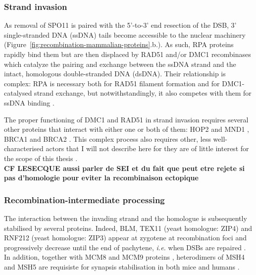 \subsubsection{Strand invasion}
As removal of SPO11 is paired with the 5’-to-3’ end resection of the DSB, 3’ single-stranded DNA (ssDNA) tails become accessible to the nuclear machinery (Figure~\ref{fig:recombination-mammalian-proteins}.b.).
As such, RPA proteins rapidly bind them \citep{he1995rpa} but are then displaced by RAD51 and/or DMC1 recombinases \citep{pittman1998meiotic,yoshida1998mouse} which catalyze the pairing and exchange between the ssDNA strand and the intact, homologous double-stranded DNA (dsDNA).
Their relationship is complex: RPA is necessary both for RAD51 filament formation and for DMC1-catalysed strand exchange, but notwithstandingly, it also competes with them for ssDNA binding \citep{sung2003rad51}.

The proper functioning of DMC1 and RAD51 in strand invasion requires several other proteins that interact with either one or both of them: HOP2 and MND1 \citep{bugreev2014hop2mnd1}, BRCA1 \citep{scully1997association} and BRCA2 \citep{thorslund2007interactions}.
This complex process also requires other, less well-characterised actors that I will not describe here for they are of little interest for the scope of this thesis \citep[but for review, see][and Figure~\ref{fig:recombination-mammalian-proteins}.c.]{neale2006clarifying}.\\

\textbf{CF LESECQUE aussi parler de SEI et du fait que peut etre rejete si pas d'homologie pour eviter la recombinaison ectopique}

\subsubsection{Recombination-intermediate processing}
The interaction between the invading strand and the homologue is subsequently stabilised by several proteins.
Indeed, BLM, TEX11 (yeast homologue: ZIP4) and RNF212 (yeast homologue: ZIP3) appear at zygotene at recombination foci and progressively decrease until the end of pachytene, \textit{i.e.} when DSBs are repaired \citep[reviewed in][]{baudat2013meiotic}. 
In addition, together with MCM8 and MCM9 proteins \citep{lutzmann2012mcm8}, heterodimers of MSH4 and MSH5 \citep{scully1997association} are requisiste for synapsis stabilisation in both mice \citep{devries1999mouse,kneitz2000muts} and humans \citep{snowden2004hmsh4hmsh5}.

